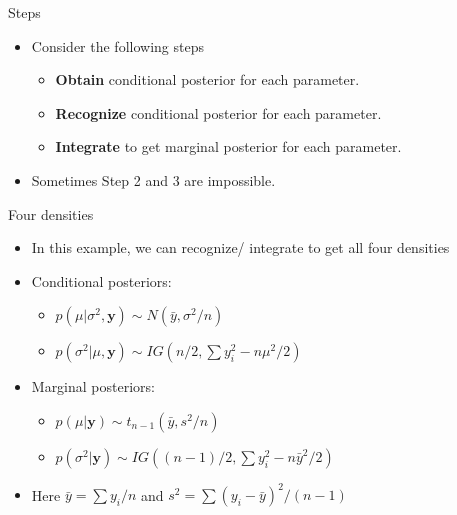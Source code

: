 \documentclass[10pt]{beamer}
\begin{document}
\begin{frame}{Steps}
  \begin{itemize}
  \item Consider the following steps

    \begin{itemize}
    \item {\bf Obtain} conditional posterior for each parameter.

    \item {\bf Recognize} conditional posterior for each parameter.

    \item {\bf Integrate} to get marginal posterior for each parameter.
    \end{itemize}

  \item Sometimes Step 2 and 3 are impossible.
  \end{itemize}
\end{frame}
\begin{frame}{Four densities}
  \begin{itemize}
  \item In this example, we can recognize/ integrate to get all four densities

  \item Conditional posteriors:

    \begin{itemize}
    \item $p(\mu|\sigma^2,{\bm y})\sim N(\bar{y},\sigma^2/n)$
    \item $p(\sigma^2|\mu,{\bm y})\sim IG(n/2,\sum y_i^2-n\mu^2/2)$
    \end{itemize}

  \item Marginal posteriors:

    \begin{itemize}
    \item $p(\mu|{\bm y})\sim t_{n-1}(\bar{y},s^2/n)$
    \item $p(\sigma^2|{\bm y})\sim IG((n-1)/2,\sum y^2_i-n\bar{y}^2/2)$
    \end{itemize}

  \item Here $\bar{y}=\sum y_i/n$ and
    $s^2=\sum(y_i-\bar{y})^2/(n-1)$
  \end{itemize}
\end{frame}
\end{document}

